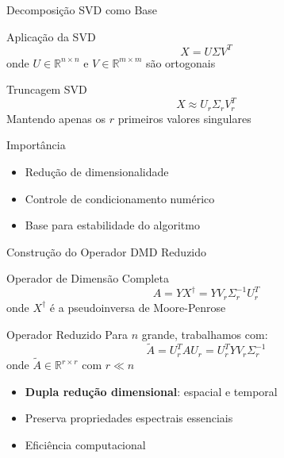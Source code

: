 \documentclass[aspectratio=169]{beamer}
\begin{document}
\begin{frame}{Decomposição SVD como Base}
    \begin{block}{Aplicação da SVD}
        \begin{equation}
            X = U\Sigma V^T
        \end{equation}
        onde $U \in \mathbb{R}^{n \times n}$ e $V \in \mathbb{R}^{m \times m}$ são ortogonais
    \end{block}
    
    \begin{block}{Truncagem SVD}
        \begin{equation}
            X \approx U_r\Sigma_r V_r^T
        \end{equation}
        Mantendo apenas os $r$ primeiros valores singulares
    \end{block}
    
    \begin{alertblock}{Importância}
        \begin{itemize}
            \item Redução de dimensionalidade
            \item Controle de condicionamento numérico
            \item Base para estabilidade do algoritmo
        \end{itemize}
    \end{alertblock}
\end{frame}

\begin{frame}{Construção do Operador DMD Reduzido}
    \begin{block}{Operador de Dimensão Completa}
        \begin{equation}
            A = YX^{\dagger} = YV_r\Sigma_r^{-1}U_r^T
        \end{equation}
        onde $X^{\dagger}$ é a pseudoinversa de Moore-Penrose
    \end{block}
    
    \begin{block}{Operador Reduzido}
        Para $n$ grande, trabalhamos com:
        \begin{equation}
            \tilde{A} = U_r^T A U_r = U_r^T Y V_r \Sigma_r^{-1}
        \end{equation}
        onde $\tilde{A} \in \mathbb{R}^{r \times r}$ com $r \ll n$
    \end{block}
    
    \begin{itemize}
        \item \textbf{Dupla redução dimensional}: espacial e temporal
        \item Preserva propriedades espectrais essenciais
        \item Eficiência computacional
    \end{itemize}
\end{frame}
\end{document}

